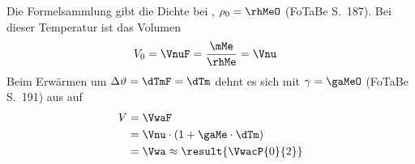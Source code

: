 Die Formelsammlung gibt die Dichte bei \TAmO, $\rho_0 = \rhMeO$ (FoTaBe S.~187). Bei dieser Temperatur ist das Volumen
\begin{align}
 V_0 &= \VnuF = \frac{\mMe}{\rhMe} = \Vnu
\end{align}
Beim Erwärmen um $\Delta\vartheta = \dTmF = \dTm$ dehnt es sich mit $\gamma = \gaMeO$ (FoTaBe S.~191) aus auf
\begin{align}
 V &= \VwaF \\
   &= \Vnu\cdot\left(1+\gaMe\cdot\dTm\right) \\
   &= \Vwa \approx \result{\VwacP{0}{2}}
\end{align}
